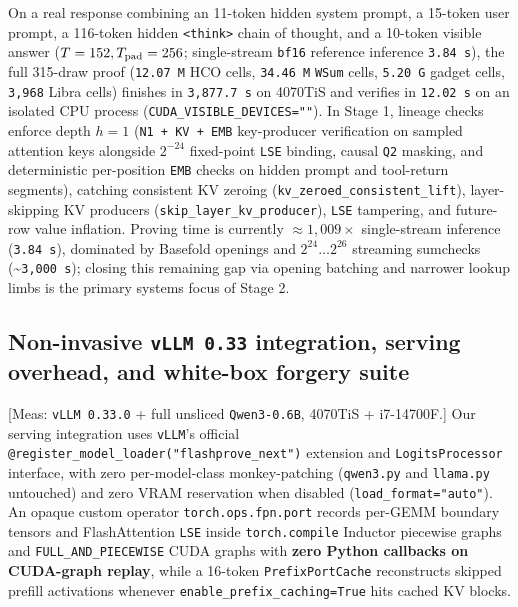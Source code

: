 \documentclass[10pt]{article}
\begin{document}
On a real response combining an 11-token hidden system prompt, a 15-token user prompt, a 116-token hidden \texttt{<think>} chain of thought, and a 10-token visible answer ($T=152, T_{\rm pad}=256$; single-stream \texttt{bf16} reference inference \texttt{3.\allowbreak{}84 s}), the full 315-draw proof (\texttt{12.\allowbreak{}07 M} HCO cells, \texttt{34.\allowbreak{}46 M} \texttt{WSum} cells, \texttt{5.\allowbreak{}20 G} gadget cells, \texttt{3,968} Libra cells) finishes in \texttt{3,877.\allowbreak{}7 s} on 4070TiS and verifies in \texttt{12.\allowbreak{}02 s} on an isolated CPU process (\texttt{CUDA\_\allowbreak{}VISIBLE\_\allowbreak{}DEVICES=""}). In Stage 1, lineage checks enforce depth $h=1$ (\texttt{N1 + KV + EMB} key-producer verification on sampled attention keys alongside $2^{-24}$ fixed-point \texttt{LSE} binding, causal \texttt{Q2} masking, and deterministic per-position \texttt{EMB} checks on hidden prompt and tool-return segments), catching consistent KV zeroing (\texttt{kv\_\allowbreak{}zeroed\_\allowbreak{}consistent\_\allowbreak{}lift}), layer-skipping KV producers (\texttt{skip\_\allowbreak{}layer\_\allowbreak{}kv\_\allowbreak{}producer}), \texttt{LSE} tampering, and future-row value inflation. Proving time is currently $\approx 1{,}009\times$ single-stream inference (\texttt{3.\allowbreak{}84 s}), dominated by Basefold openings and $2^{24}\dots 2^{26}$ streaming sumchecks (\textasciitilde{}\texttt{3,000 s}); closing this remaining gap via opening batching and narrower lookup limbs is the primary systems focus of Stage 2.

\subsection{Non-invasive \texttt{vLLM 0.\allowbreak{}33} integration, serving overhead, and white-box forgery suite}
[Meas: \texttt{vLLM 0.\allowbreak{}33.\allowbreak{}0} + full unsliced \texttt{Qwen3-0.\allowbreak{}6B}, 4070TiS + i7-14700F.] Our serving integration uses \texttt{vLLM}'s official \texttt{@register\_\allowbreak{}model\_\allowbreak{}loader("flashprove\_\allowbreak{}next")} extension and \texttt{LogitsProcessor} interface, with zero per-model-class monkey-patching (\texttt{qwen3.\allowbreak{}py} and \texttt{llama.\allowbreak{}py} untouched) and zero VRAM reservation when disabled (\texttt{load\_\allowbreak{}format="auto"}). An opaque custom operator \texttt{torch.\allowbreak{}ops.\allowbreak{}fpn.\allowbreak{}port} records per-GEMM boundary tensors and FlashAttention \texttt{LSE} inside \texttt{torch.\allowbreak{}compile} Inductor piecewise graphs and \texttt{FULL\_\allowbreak{}AND\_\allowbreak{}PIECEWISE} CUDA graphs with \textbf{zero Python callbacks on CUDA-graph replay}, while a 16-token \texttt{PrefixPortCache} reconstructs skipped prefill activations whenever \texttt{enable\_\allowbreak{}prefix\_\allowbreak{}caching=True} hits cached KV blocks.
\end{document}
